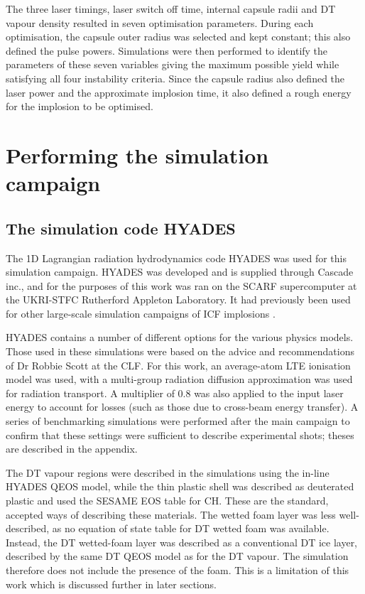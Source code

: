 The three laser timings, laser switch off time, internal capsule radii and DT vapour density resulted in seven optimisation parameters. During each optimisation, the capsule outer radius was selected and kept constant; this also defined the pulse powers. Simulations were then performed to identify the parameters of these seven variables giving the maximum possible yield while satisfying all four instability criteria. Since the capsule radius also defined the laser power and the approximate implosion time, it also defined a rough energy for the implosion to be optimised.


\section{Performing the simulation campaign} \label{sec: OptimisationCampaign}

\subsection{The simulation code HYADES}

The 1D Lagrangian radiation hydrodynamics code HYADES was used for this simulation campaign.  HYADES was developed and is supplied through Cascade inc., and for the purposes of this work was ran on the SCARF supercomputer at the UKRI-STFC Rutherford Appleton Laboratory. It had previously been used for other large-scale simulation campaigns of ICF implosions \cite{Hatfield2019}. 

HYADES contains a number of different options for the various physics models. Those used in these simulations were based on the advice and recommendations of Dr Robbie Scott at the CLF. For this work, an average-atom LTE ionisation model was used, with a multi-group radiation diffusion approximation was used for radiation transport. A multiplier of 0.8 was also applied to the input laser energy to account for losses (such as those due to cross-beam energy transfer). A series of benchmarking simulations were performed after the main campaign to confirm that these settings were sufficient to describe experimental shots; theses are described in the appendix.

The DT vapour regions were described in the simulations using the in-line HYADES QEOS model, while the thin plastic shell was described as deuterated plastic and used the SESAME EOS table for CH. These are the standard, accepted ways of describing these materials. The wetted foam layer was less well-described, as no equation of state table for DT wetted foam was available. Instead, the DT wetted-foam layer was described as a conventional DT ice layer, described by the same DT QEOS model as for the DT vapour. The simulation therefore does not include the presence of the foam. This is a limitation of this work which is discussed further in later sections.

